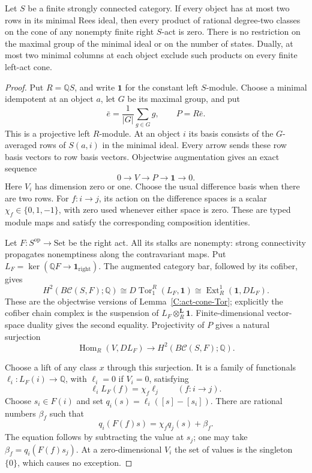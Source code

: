 \begin{theorem}
\label{C:categorical-two-row-act-cups}
Let $S$ be a finite strongly connected category. If every object
has at most two rows in its minimal Rees ideal, then every product
of rational degree-two classes on the cone of any nonempty finite
right $S$-act is zero. There is no restriction on the maximal
group of the minimal ideal or on the number of states. Dually,
at most two minimal columns at each object exclude such products
on every finite left-act cone.
\end{theorem}
\begin{proof}
Put $R=\mathbb QS$, and write $\mathbf1$ for the constant
left $S$-module. Choose a minimal idempotent at an object $a$,
let $G$ be its maximal group, and put
\[
 \bar e=\frac1{|G|}\sum_{g\in G}g,\qquad P=R\bar e.
\]
This is a projective left $R$-module. At an object $i$ its
basis consists of the $G$-averaged rows of $S(a,i)$ in the minimal
ideal. Every arrow sends these row basis vectors to row basis
vectors. Objectwise augmentation gives an exact sequence
\[
 0\longrightarrow V\longrightarrow P\longrightarrow\mathbf1
 \longrightarrow0.
\]
Here $V_i$ has dimension zero or one. Choose the usual difference
basis when there are two rows. For $f:i\to j$, its action on
the difference spaces is a scalar $\chi_f\in\{0,1,-1\}$,
with zero used whenever either space is zero. These are typed
module maps and satisfy the corresponding composition identities.

Let $F:S^{\mathrm{op}}\to\mathrm{Set}$ be the right act.
All its stalks are nonempty: strong connectivity propagates
nonemptiness along the contravariant maps. Put
$L_F=\ker(\mathbb QF\to\mathbf1_{\mathrm{right}})$.
The augmented category bar, followed by its cofiber, gives
\[
 H^2(B\mathcal C(S,F);\mathbb Q)
   \cong D\operatorname{Tor}^{R}_1(L_F,\mathbf1)
   \cong\operatorname{Ext}^{1}_R(\mathbf1,DL_F).
\]
These are the objectwise versions of
Lemma~\ref{C:act-cone-Tor}; explicitly the cofiber chain complex
is the suspension of $L_F\otimes_R^{\mathbf L}\mathbf1$.
Finite-dimensional vector-space duality gives the second equality.
Projectivity of $P$ gives a natural surjection
\[
 \operatorname{Hom}_R(V,DL_F)\longrightarrow
 H^2(B\mathcal C(S,F);\mathbb Q).
\]

Choose a lift of any class $x$ through this surjection. It is a
family of functionals $\ell_i:L_F(i)\to\mathbb Q$, with
$\ell_i=0$ if $V_i=0$, satisfying
\[
 \ell_i L_F(f)=\chi_f\ell_j\qquad(f:i\to j).
\]
Choose $s_i\in F(i)$ and set
$q_i(s)=\ell_i([s]-[s_i])$. There are rational numbers $\beta_f$
such that
\[
 q_i(F(f)s)=\chi_fq_j(s)+\beta_f.
\]
The equation follows by subtracting the value at $s_j$; one may
take $\beta_f=q_i(F(f)s_j)$. At a zero-dimensional $V_i$ the
set of values is the singleton $\{0\}$, which causes no exception.


\end{proof}
